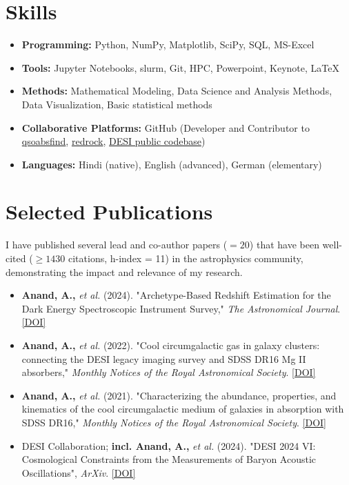 \documentclass[a4paper,11pt]{article}
\begin{document}
\section*{Skills}
\begin{itemize}[noitemsep, topsep=0pt]
    \item \textbf{Programming:} Python, NumPy, Matplotlib, SciPy, SQL, MS-Excel
    \item \textbf{Tools:} Jupyter Notebooks, slurm, Git, HPC, Powerpoint, Keynote, LaTeX
    \item \textbf{Methods:} Mathematical Modeling, Data Science and Analysis Methods, Data Visualization, Basic statistical methods
    \item \textbf{Collaborative Platforms:} GitHub (Developer and Contributor to \href{https://github.com/abhi0395/qsoabsfind}{qsoabsfind}, \href{https://github.com/desihub/redrock}{redrock}, \href{https://github.com/desihub}{DESI public codebase})
     \item \textbf{Languages:} Hindi (native), English (advanced), German (elementary)
\end{itemize}

\section*{Selected Publications}
I have published several lead and co-author papers ($= 20$) that have been well-cited ($\geq 1430$ citations, h-index = 11) in the astrophysics community, demonstrating the impact and relevance of my research.
\begin{itemize}[noitemsep, topsep=0pt]
    \item \textbf{Anand, A.,} \textit{et al.} (2024). "Archetype-Based Redshift Estimation for the Dark Energy Spectroscopic Instrument Survey," \textit{The Astronomical Journal}. \href{https://iopscience.iop.org/article/10.3847/1538-3881/ad60c2}{[DOI]}
    \item \textbf{Anand, A.,} \textit{et al.} (2022). "Cool circumgalactic gas in galaxy clusters: connecting the DESI legacy imaging survey and SDSS DR16 Mg II absorbers," \textit{Monthly Notices of the Royal Astronomical Society}. \href{https://doi.org/10.1093/mnras/stab871}{[DOI]}
    \item \textbf{Anand, A.,} \textit{et al.} (2021). "Characterizing the abundance, properties, and kinematics of the cool circumgalactic medium of galaxies in absorption with SDSS DR16," \textit{Monthly Notices of the Royal Astronomical Society}. \href{https://doi.org/10.1093/mnras/stac928}{[DOI]}
    \item DESI Collaboration; \textbf{incl. Anand, A.,} \textit{et al.} (2024). "DESI 2024 VI: Cosmological Constraints from the Measurements of Baryon Acoustic Oscillations", \textit{ArXiv}. \href{10.48550/arXiv.2404.03002}{[DOI]}
\end{itemize}
\end{document}
